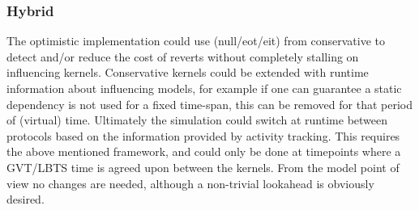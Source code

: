 \subsubsection{Hybrid}
The optimistic implementation could use (null/eot/eit) from conservative to detect and/or reduce the cost of reverts without completely stalling on influencing kernels.
Conservative kernels could be extended with runtime information about influencing models, for example if one can guarantee a static dependency is not used for a fixed time-span, this can be removed for that period of (virtual) time. 
Ultimately the simulation could switch at runtime between protocols based on the information provided by activity tracking. This requires the above mentioned framework, and could only be done at timepoints where a GVT/LBTS time is agreed upon between the kernels. From the model point of view no changes are needed, although a non-trivial lookahead is obviously desired. 
